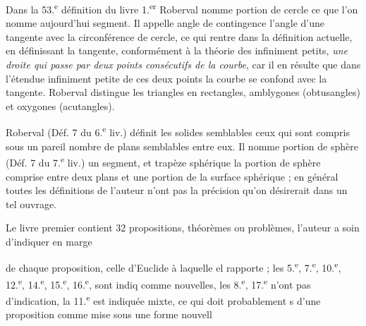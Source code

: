 \documentclass[11pt,a4paper]{article}
\begin{document}
Dans la 53.\textsuperscript{e} définition du livre 1.\textsuperscript{er} Roberval nomme portion de cercle ce que l'on nomme aujourd'hui segment.
Il appelle angle de contingence l'angle d'une tangente avec la circonférence de cercle, ce qui rentre dans la définition actuelle, en définissant la tangente, conformément à la théorie des infiniment petits, \emph{une droite qui passe par deux points consécutifs de la courbe}, car il en résulte que dans l'étendue infiniment petite de ces deux points la courbe se confond avec la tangente. Roberval distingue les triangles en rectangles, amblygones (obtusangles) et oxygones (acutangles).

Roberval (Déf. 7 du 6.\textsuperscript{e} liv.) définit les solides semblables ceux qui sont compris sous un pareil nombre de plans semblables entre eux. Il nomme
portion de sphère (Déf. 7 du 7.\textsuperscript{e} liv.) un segment, et trapèze sphérique la portion de sphère comprise entre deux plans et une portion de la surface sphérique ; en général toutes les définitions de l'auteur n'ont pas la précision qu'on désirerait dans un tel ouvrage.

Le livre premier contient 32 propositions, théorèmes ou problèmes, l'auteur a soin d'indiquer en marge


de chaque proposition, celle d'Euclide à laquelle el rapporte ; les 5.\textsuperscript{e}, 7.\textsuperscript{e}, 10.\textsuperscript{e}, 12.\textsuperscript{e}, 14.\textsuperscript{e}, 15.\textsuperscript{e}, 16.\textsuperscript{e}, sont indiq comme nouvelles, les 8.\textsuperscript{e}, 17.\textsuperscript{e} n'ont pas d'indication, \ill{} la 11.\textsuperscript{e} est indiquée mixte, ce qui doit probablement s\ill{} d'une proposition comme mise sous une forme nouvell
\end{document}
